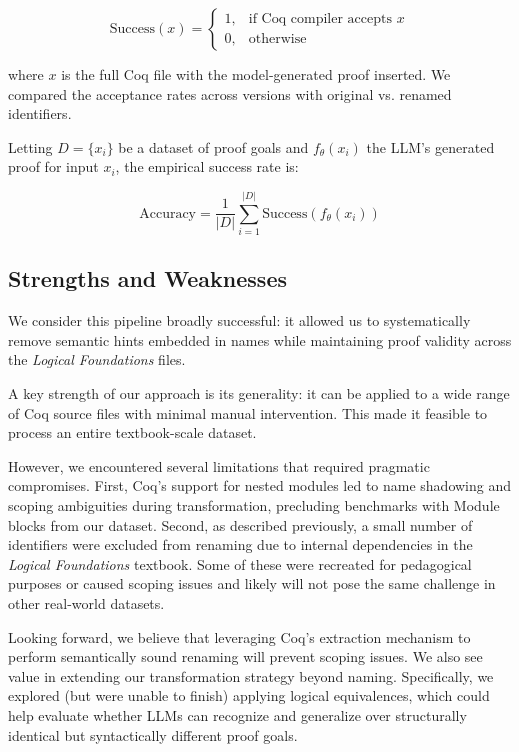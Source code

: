 \[
\text{Success}(x) =
\begin{cases}
1, & \text{if Coq compiler accepts } x \\
0, & \text{otherwise}
\end{cases}
\]

\noindent where \( x \) is the full Coq file with the model-generated proof inserted. We compared the acceptance rates across versions with original vs. renamed identifiers.

Letting \( D = \{x_i\} \) be a dataset of proof goals and \( f_\theta(x_i) \) the LLM's generated proof for input \( x_i \), the empirical success rate is:

\[
\text{Accuracy} = \frac{1}{|D|} \sum_{i=1}^{|D|} \text{Success}(f_\theta(x_i))
\]

\subsection{Strengths and Weaknesses}
We consider this pipeline broadly successful: it allowed us to systematically remove semantic hints embedded in names while maintaining 
proof validity across the \textit{Logical Foundations} files.

A key strength of our approach is its generality: it can be applied to a wide range of Coq source files with minimal manual intervention. 
This made it feasible to process an entire textbook-scale dataset.

However, we encountered several limitations that required pragmatic compromises.
First, Coq's support for nested modules led to name shadowing and scoping ambiguities during transformation,
precluding benchmarks with Module blocks from our dataset.
Second, as described previously, a small number of identifiers were excluded from renaming due 
to internal dependencies in the \textit{Logical Foundations} textbook. Some of these were 
recreated for pedagogical purposes or caused scoping issues and likely will not pose the same challenge in other real-world datasets.

Looking forward, we believe that leveraging Coq's extraction mechanism to perform semantically sound renaming will prevent scoping issues.
We also see value in extending our transformation strategy beyond naming.
Specifically, we explored (but were unable to finish) applying logical equivalences, which could help evaluate whether LLMs can recognize and generalize over structurally identical but syntactically different proof goals.
